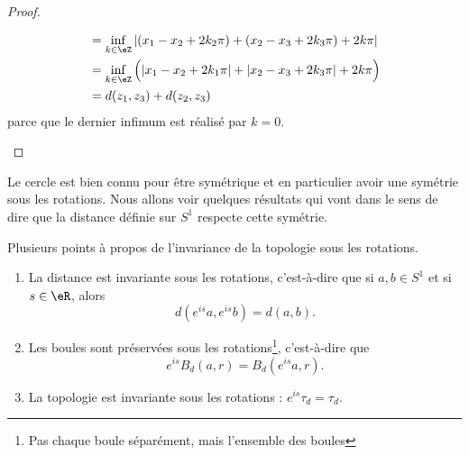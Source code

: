 \begin{proof}
\begin{enumerate}
\begin{itemize}
\begin{subequations}
\begin{align}
					                       & =\inf_{k\in \eZ}| (x_1-x_2+2k_2\pi)+(x_2-x_3+2k_3\pi)+2k\pi |             \\
					                       & =\inf_{k\in \eZ}\Big( | x_1-x_2+2k_1\pi |+| x_2-x_3+2k_3\pi |+2k\pi \Big) \\
					                       & =d(z_1,z_3)+d(z_2,z_3)
				            \end{align}
			            \end{subequations}
			            parce que le dernier infimum est réalisé par \( k=0\).
		      \end{itemize}
	\end{enumerate}
\end{proof}

Le cercle est bien connu pour être symétrique et en particulier avoir une symétrie sous les rotations. Nous allons voir quelques résultats qui vont dans le sens de dire que la distance définie sur \( S^1\) respecte cette symétrie.

\begin{lemma}       \label{LEMooCQCAooAEctbe}
	Plusieurs points à propos de l'invariance de la topologie sous les rotations.
	\begin{enumerate}
		\item
		      La distance est invariante sous les rotations, c'est-à-dire que si \( a,b\in S^1\) et si \( s\in \eR\), alors
		      \begin{equation}
			      d( e^{is}a, e^{is}b)=d(a,b).
		      \end{equation}
		\item       \label{ITEMooCIPYooTyPQLj}
		      Les boules sont préservées sous les rotations\footnote{Pas chaque boule séparément, mais l'ensemble des boules}, c'est-à-dire que
		      \begin{equation}
			      e^{is}B_d(a,r)=B_d( e^{is}a,r).
		      \end{equation}
		\item
		      La topologie est invariante sous les rotations : \(  e^{is}\tau_d=\tau_d\).
	\end{enumerate}
\end{lemma}

